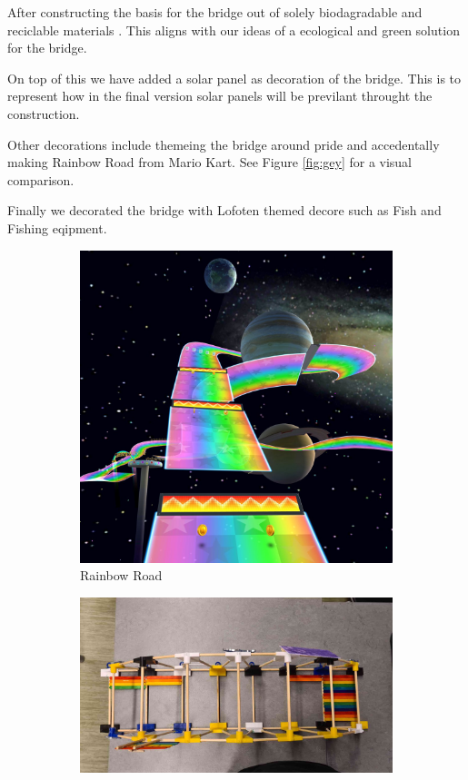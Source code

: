 \documentclass{report}
\newcommand{\subimgw}{.7\linewidth}
\begin{document}
After constructing the basis for the bridge out of solely biodagradable and reciclable materials \cite{wiki:pla}. This aligns with our ideas of a ecological and green solution for the bridge.

On top of this we have added a solar panel as decoration of the bridge. This is to represent how in the final version solar panels will be previlant throught the construction.

Other decorations include themeing the bridge around pride and accedentally making Rainbow Road from Mario Kart. See Figure \ref{fig:gey} for a visual comparison.

Finally we decorated the bridge with Lofoten themed decore such as Fish and Fishing eqipment.

\begin{figure}[H]
	\begin{subfigure}{.5\textwidth}
		\centering
		\includegraphics[width=\subimgw,trim={0 10cm 0 0},clip]{rainbow-road}

		\caption{Rainbow Road}
	\end{subfigure}%
	\begin{subfigure}{.5\textwidth}
		\centering
		\includegraphics[width=\subimgw,trim={0 0 0 0},clip]{top}


\end{subfigure}
\end{figure}
\end{document}
